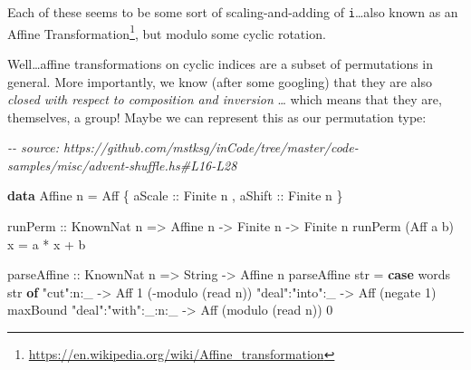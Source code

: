 \documentclass[]{article}
\newenvironment{Shaded}{}{}
\newcommand{\CommentTok}[1]{\textcolor[rgb]{0.38,0.63,0.69}{\textit{#1}}}
\newcommand{\DataTypeTok}[1]{\textcolor[rgb]{0.56,0.13,0.00}{#1}}
\newcommand{\DecValTok}[1]{\textcolor[rgb]{0.25,0.63,0.44}{#1}}
\newcommand{\FunctionTok}[1]{\textcolor[rgb]{0.02,0.16,0.49}{#1}}
\newcommand{\KeywordTok}[1]{\textcolor[rgb]{0.00,0.44,0.13}{\textbf{#1}}}
\newcommand{\NormalTok}[1]{#1}
\newcommand{\OperatorTok}[1]{\textcolor[rgb]{0.40,0.40,0.40}{#1}}
\newcommand{\OtherTok}[1]{\textcolor[rgb]{0.00,0.44,0.13}{#1}}
\newcommand{\StringTok}[1]{\textcolor[rgb]{0.25,0.44,0.63}{#1}}
\renewcommand{\href}[2]{#2\footnote{\url{#1}}}
\begin{document}
Each of these seems to be some sort of scaling-and-adding of
\texttt{i}\ldots also known as an
\href{https://en.wikipedia.org/wiki/Affine_transformation}{Affine
Transformation}, but modulo some cyclic rotation.

Well\ldots affine transformations on cyclic indices are a subset of permutations
in general. More importantly, we know (after some googling) that they are also
\emph{closed with respect to composition and inversion} \ldots{} which means
that they are, themselves, a group! Maybe we can represent this as our
permutation type:

\begin{Shaded}
\begin{Highlighting}[]
\CommentTok{{-}{-} source: https://github.com/mstksg/inCode/tree/master/code{-}samples/misc/advent{-}shuffle.hs\#L16{-}L28}

\KeywordTok{data} \DataTypeTok{Affine}\NormalTok{ n }\OtherTok{=} \DataTypeTok{Aff}
\NormalTok{    \{}\OtherTok{ aScale ::} \DataTypeTok{Finite}\NormalTok{ n}
\NormalTok{    ,}\OtherTok{ aShift ::} \DataTypeTok{Finite}\NormalTok{ n}
\NormalTok{    \}}

\OtherTok{runPerm ::} \DataTypeTok{KnownNat}\NormalTok{ n }\OtherTok{=>} \DataTypeTok{Affine}\NormalTok{ n }\OtherTok{{-}>} \DataTypeTok{Finite}\NormalTok{ n }\OtherTok{{-}>} \DataTypeTok{Finite}\NormalTok{ n}
\NormalTok{runPerm (}\DataTypeTok{Aff}\NormalTok{ a b) x }\OtherTok{=}\NormalTok{ a }\OperatorTok{*}\NormalTok{ x }\OperatorTok{+}\NormalTok{ b}

\OtherTok{parseAffine ::} \DataTypeTok{KnownNat}\NormalTok{ n }\OtherTok{=>} \DataTypeTok{String} \OtherTok{{-}>} \DataTypeTok{Affine}\NormalTok{ n}
\NormalTok{parseAffine str }\OtherTok{=} \KeywordTok{case} \FunctionTok{words}\NormalTok{ str }\KeywordTok{of}
    \StringTok{"cut"}\OperatorTok{:}\NormalTok{n}\OperatorTok{:}\NormalTok{\_           }\OtherTok{{-}>} \DataTypeTok{Aff}                \DecValTok{1}\NormalTok{  (}\OperatorTok{{-}}\NormalTok{modulo (}\FunctionTok{read}\NormalTok{ n))}
    \StringTok{"deal"}\OperatorTok{:}\StringTok{"into"}\OperatorTok{:}\NormalTok{\_     }\OtherTok{{-}>} \DataTypeTok{Aff}\NormalTok{        (}\FunctionTok{negate} \DecValTok{1}\NormalTok{)          }\FunctionTok{maxBound}
    \StringTok{"deal"}\OperatorTok{:}\StringTok{"with"}\OperatorTok{:}\NormalTok{\_}\OperatorTok{:}\NormalTok{n}\OperatorTok{:}\NormalTok{\_ }\OtherTok{{-}>} \DataTypeTok{Aff}\NormalTok{ (modulo (}\FunctionTok{read}\NormalTok{ n))                 }\DecValTok{0}
\end{Highlighting}
\end{Shaded}
\end{document}
